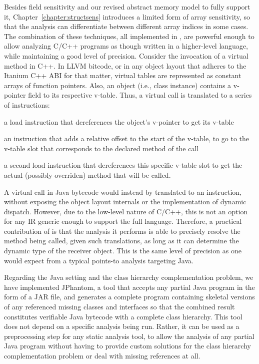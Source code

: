 Besides field sensitivity and our revised abstract memory model to
fully support it, Chapter~\ref{chapter:structsens} introduces a
limited form of array sensitivity, so that the analysis can
differentiate between different array indices in some cases. The
combination of these techniques, all implemented in \cclyzer{}, are
powerful enough to allow analyzing C/C++ programs as though written in
a higher-level language, while maintaining a good level of
precision. Consider the invocation of a virtual method in C++. In LLVM
bitcode, or in any object layout that adheres to the Itanium C++ ABI
\cite{itanium:cxx_abi} for that matter, virtual tables are represented
as constant arrays of function pointers. Also, an object (i.e., class
instance) contains a v-pointer field to its respective v-table. Thus,
a virtual call is translated to a series of instructions:
\begin{compactitem}[\(\cdot\)]
\item a load instruction that dereferences the object's v-pointer to
  get its v-table
\item an instruction that adds a relative offset to the start of the
  v-table, to go to the v-table slot that corresponds to the declared
  method of the call
\item a second load instruction that dereferences this specific
  v-table slot to get the actual (possibly overriden) method that will
  be called.
\end{compactitem}

A virtual call in Java bytecode would instead by translated to an
 instruction, without exposing the object layout
internals or the implementation of dynamic dispatch. However, due to
the low-level nature of C/C++, this is not an option for any IR
generic enough to support the full language. Therefore, a practical
contribution of \cclyzer{} is that the analysis it performs is able to
precisely resolve the method being called, given such translations, as
long as it can determine the dynamic type of the receiver object. This
is the same level of precision as one would expect from a typical
points-to analysis targeting Java.

Regarding the Java setting and the class hierarchy complementation
problem, we have implemented JPhantom, a tool that accepts any partial
Java program in the form of a JAR file, and generates a complete
program containing skeletal versions of any referenced missing classes
and interfaces so that the combined result constitutes verifiable Java
bytecode with a complete class hierarchy. This tool does not depend on
a specific analysis being run. Rather, it can be used as a
preprocessing step for any static analysis tool, to allow the analysis
of any partial Java program without having to provide custom solutions
for the class hierarchy complementation problem or deal with missing
references at all.

